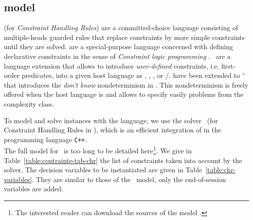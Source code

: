 \subsection{{\CHR} model}
\label{sec:cp-chr}

{\CHR} (for {\it Constraint Handling Rules}) \cite{1994_fruhwirth_Chap,1998_fruhwirth_JLP,2009_fruhwirth_Book,2011_fruhwirth_Book} are a committed-choice language consisting of multiple-heads guarded rules that replace constraints by more  simple constraints until they are solved.
{\CHR} are a special-purpose language concerned with defining declarative constraints in the sense of {\it Constraint logic programming} \cite{1991_vanHentenryck_KER,1994_jaffar_JLP}.
\CHR\ are a language extension that allows to introduce {\it user-defined} constraints, i.e. first-order predicates, into a given host language as {\PROLOG}, {\LISP}, {\JAVA}, or {\C}/{\CPP}.
\CHR{} have been extended to {\CHR}\ensuremath{^{\vee}} \cite{1998_abdennadher_Chap} that introduces the \emph{don't know} nondeterminism in \CHR{} \cite{2013_betz_ACMTCL}.
This nondeterminism is freely offered when the host language is {\PROLOG} and allows to specify easily problems from the {\NP} complexity class.

To model and solve {\UTP} instances with the {\CHR} language, we use the {\CHRPP} solver~\cite{2019_barichard_ICLP} (for Constraint Handling Rules in {\CPP}), which is an efficient integration of {\CHR} in the programming language \texttt{C++}.\\

The full model for \CHRPP\ is too long to be detailed here\footnote{The interested reader can download the sources of the model \cite{uspSite}.}. We give in Table~\ref{table:contrainte-tab-chr} the list of constraints taken into account by the solver. The decision variables to be instantiated are given in Table~\ref{table:chr-variables}. They are similar to those of the \MINIZINC\ model, only the end-of-session variables are added.\\

